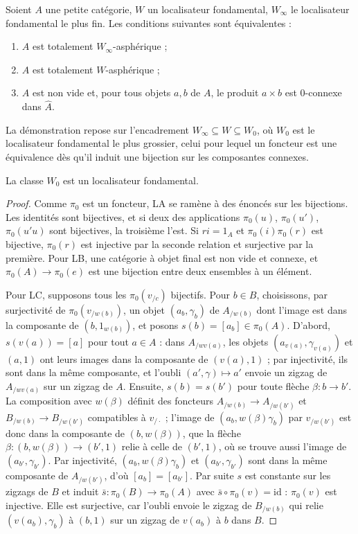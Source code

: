 \begin{enonce}
Soient $A$ une petite catégorie, $W$ un localisateur fondamental, $W_\infty$ le localisateur fondamental le plus fin. Les conditions suivantes sont équivalentes :
\begin{enumerate}
\item[(i)] $A$ est totalement $W_\infty$-asphérique ;
\item[(ii)] $A$ est totalement $W$-asphérique ;
\item[(iii)] $A$ est non vide et, pour tous objets $a, b$ de $A$, le produit $a \times b$ est $0$-connexe dans $\hat A$.
\end{enumerate}
La démonstration repose sur l'encadrement $W_\infty \subseteq W \subseteq W_0$, où $W_0$ est le localisateur fondamental le plus grossier, celui pour lequel un foncteur est une équivalence dès qu'il induit une bijection sur les composantes connexes.
\end{enonce}

\begin{lemme}\label{lem:114-W0}
La classe $W_0$ est un localisateur fondamental.
\end{lemme}

\begin{proof}
Comme $\pi_0$ est un foncteur, LA se ramène à des énoncés sur les bijections. Les identités sont bijectives, et si deux des applications $\pi_0(u)$, $\pi_0(u')$, $\pi_0(u'u)$ sont bijectives, la troisième l'est. Si $ri = 1_A$ et $\pi_0(i)\pi_0(r)$ est bijective, $\pi_0(r)$ est injective par la seconde relation et surjective par la première. Pour LB, une catégorie à objet final est non vide et connexe, et $\pi_0(A) \to \pi_0(e)$ est une bijection entre deux ensembles à un élément.

Pour LC, supposons tous les $\pi_0(v_{/c})$ bijectifs. Pour $b \in B$, choisissons, par surjectivité de $\pi_0(v_{/w(b)})$, un objet $(a_b, \gamma_b)$ de $A_{/w(b)}$ dont l'image est dans la composante de $(b, 1_{w(b)})$, et posons $s(b) = [a_b] \in \pi_0(A)$. D'abord, $s(v(a)) = [a]$ pour tout $a \in A$ : dans $A_{/wv(a)}$, les objets $(a_{v(a)}, \gamma_{v(a)})$ et $(a, 1)$ ont leurs images dans la composante de $(v(a), 1)$ ; par injectivité, ils sont dans la même composante, et l'oubli $(a', \gamma) \mapsto a'$ envoie un zigzag de $A_{/wv(a)}$ sur un zigzag de $A$. Ensuite, $s(b) = s(b')$ pour toute flèche $\beta : b \to b'$. La composition avec $w(\beta)$ définit des foncteurs $A_{/w(b)} \to A_{/w(b')}$ et $B_{/w(b)} \to B_{/w(b')}$ compatibles à $v_{/\cdot}$ ; l'image de $(a_b, w(\beta)\gamma_b)$ par $v_{/w(b')}$ est donc dans la composante de $(b, w(\beta))$, que la flèche $\beta : (b, w(\beta)) \to (b', 1)$ relie à celle de $(b', 1)$, où se trouve aussi l'image de $(a_{b'}, \gamma_{b'})$. Par injectivité, $(a_b, w(\beta)\gamma_b)$ et $(a_{b'}, \gamma_{b'})$ sont dans la même composante de $A_{/w(b')}$, d'où $[a_b] = [a_{b'}]$. Par suite $s$ est constante sur les zigzags de $B$ et induit $\bar s : \pi_0(B) \to \pi_0(A)$ avec $\bar s \circ \pi_0(v) = \mathrm{id}$ : $\pi_0(v)$ est injective. Elle est surjective, car l'oubli envoie le zigzag de $B_{/w(b)}$ qui relie $(v(a_b), \gamma_b)$ à $(b, 1)$ sur un zigzag de $v(a_b)$ à $b$ dans $B$.
\end{proof}

